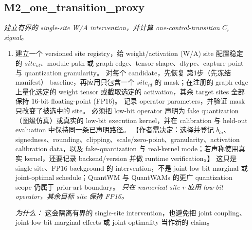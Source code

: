 \documentclass[10pt,a4paper]{article}
\begin{document}
\subsection*{M2\_one\_transition\_proxy}
\emph{建立有界的 single-site W/A intervention，并计算 one-control-transition \(C_{r}\) signal。}
\begin{enumerate}[leftmargin=*,start=2]
  \item 建立一个 versioned site registry，给 weight/activation (W/A) site 配置稳定的 \(site_{id}\)、module path 或 graph edge、tensor shape、dtype、capture point 与 quantization granularity。 对每个 candidate，先恢复 第1步（先冻结 manifest） baseline，再应用只包含一个 \(site_{id}\) 的 mask；在注册的 graph edge 上量化选定的 weight tensor 或截取选定的 activation，其余 target sites 全部保持 16-bit floating-point (FP16)。 记录 operator parameters，并验证 mask 只改变了被选中的 site。 必须把 low-bit operator 声明为 fake quantization（图级仿真）或真实的 low-bit execution kernel，并在 calibration 与 held-out evaluation 中保持同一条已声明路径。 【作者需决定：选择并登记 \(b_{lo}\)、signedness、rounding、clipping、scale/zero-point、granularity、activation calibration data，以及 fake-quantization 与 real-kernel mode；若声称使用真实 kernel，还要记录 backend/version 并做 runtime verification。】 这只是 single-site、FP16-background 的 intervention，不是 joint-low-bit marginal 或 joint-optimal schedule；QuantWM 与 QuantWAMs 的更广 quantization scope 仍属于 prior-art boundary。
\noindent\emph{只在 numerical site r 应用 low-bit operator，其余目标 site 保持 FP16。}
\par{}
\par\emph{为什么：} 这会隔离有界的 single-site intervention，也避免把 joint coupling、joint-low-bit marginal effects 或 joint optimality 当作新的 claim。

\end{enumerate}
\end{document}
